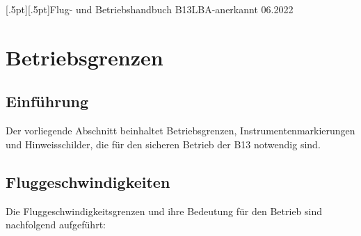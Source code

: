 [.5pt][.5pt]{\pagemark}{}{\headmark}{Flug- und Betriebshandbuch B13}{}{LBA-anerkannt 06.2022}
\pagestyle{Flughandbuch}
\renewcommand*\chapterpagestyle{Flughandbuch}


\chapter{ Betriebsgrenzen}

\section{Einführung}
Der vorliegende Abschnitt beinhaltet Betriebsgrenzen, Instrumentenmarkierungen und Hinweisschilder, die für den sicheren Betrieb der B13 notwendig sind. 

\section{Fluggeschwindigkeiten}

Die Fluggeschwindigkeitsgrenzen und ihre Bedeutung für den Betrieb sind nachfolgend aufgeführt:

